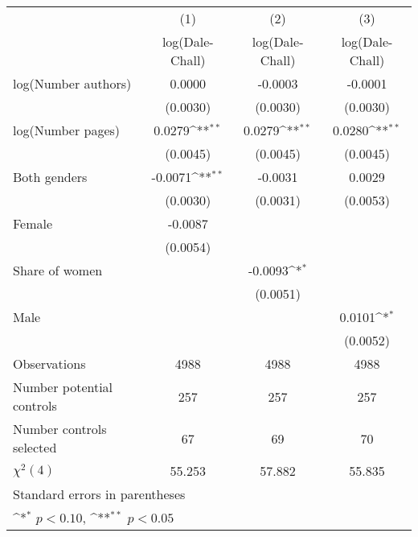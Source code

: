 {
\def\sym#1{\ifmmode^{#1}\else\(^{#1}\)\fi}
\begin{tabular}{l*{3}{c}}
\hline\hline
                    &\multicolumn{1}{c}{(1)}&\multicolumn{1}{c}{(2)}&\multicolumn{1}{c}{(3)}\\
                    &\multicolumn{1}{c}{log(Dale-Chall)}&\multicolumn{1}{c}{log(Dale-Chall)}&\multicolumn{1}{c}{log(Dale-Chall)}\\
\hline
\hspace{3mm}log(Number authors)&      0.0000        &     -0.0003        &     -0.0001        \\
                    &    (0.0030)        &    (0.0030)        &    (0.0030)        \\
[1em]
\hspace{3mm}log(Number pages)&      0.0279\sym{**}&      0.0279\sym{**}&      0.0280\sym{**}\\
                    &    (0.0045)        &    (0.0045)        &    (0.0045)        \\
[1em]
\hspace{3mm}Both genders&     -0.0071\sym{**}&     -0.0031        &      0.0029        \\
                    &    (0.0030)        &    (0.0031)        &    (0.0053)        \\
[1em]
\hspace{3mm}Female  &     -0.0087        &                    &                    \\
                    &    (0.0054)        &                    &                    \\
[1em]
\hspace{3mm}Share of women&                    &     -0.0093\sym{*} &                    \\
                    &                    &    (0.0051)        &                    \\
[1em]
\hspace{3mm}Male    &                    &                    &      0.0101\sym{*} \\
                    &                    &                    &    (0.0052)        \\
\hline
Observations        &        4988        &        4988        &        4988        \\
Number potential controls&         257        &         257        &         257        \\
Number controls selected&          67        &          69        &          70        \\
$\chi^2(4)$         &      55.253        &      57.882        &      55.835        \\
\hline\hline
\multicolumn{4}{l}{\footnotesize Standard errors in parentheses}\\
\multicolumn{4}{l}{\footnotesize \sym{*} \(p<0.10\), \sym{**} \(p<0.05\)}\\
\end{tabular}
}
